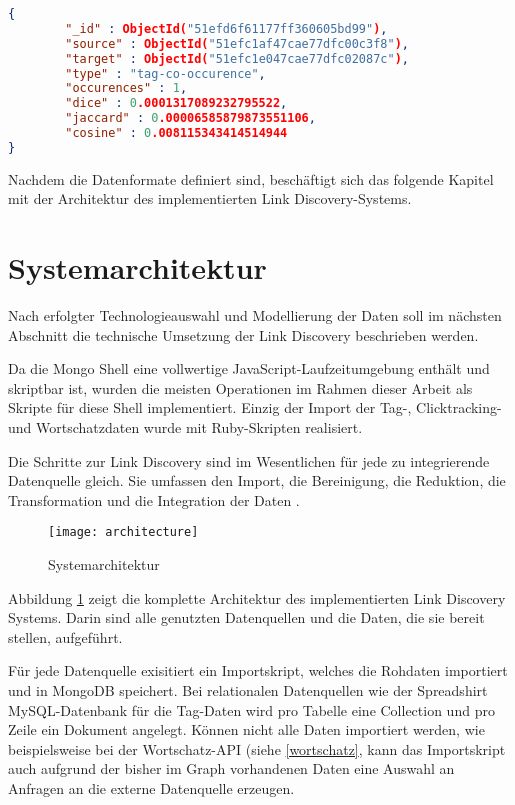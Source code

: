 \begin{lstlisting}[language=json, label={lst:edge_json}, caption={Kantendokument in JSON}]
{
        "_id" : ObjectId("51efd6f61177ff360605bd99"),
        "source" : ObjectId("51efc1af47cae77dfc00c3f8"),
        "target" : ObjectId("51efc1e047cae77dfc02087c"),
        "type" : "tag-co-occurence",
        "occurences" : 1,
        "dice" : 0.0001317089232795522,
        "jaccard" : 0.00006585879873551106,
        "cosine" : 0.008115343414514944
}
\end{lstlisting}

Nachdem die Datenformate definiert sind, beschäftigt sich das folgende Kapitel mit der Architektur des implementierten Link Discovery-Systems.

\section{Systemarchitektur}

Nach erfolgter Technologieauswahl und Modellierung der Daten soll im nächsten Abschnitt die technische Umsetzung der Link Discovery beschrieben werden.

Da die Mongo Shell eine vollwertige JavaScript-Laufzeitumgebung enthält und skriptbar ist, wurden die meisten Operationen im Rahmen dieser Arbeit als Skripte für diese Shell implementiert. Einzig der Import der Tag-, Clicktracking- und Wortschatzdaten wurde mit Ruby-Skripten realisiert.

Die Schritte zur Link Discovery sind im Wesentlichen für jede zu integrierende Datenquelle gleich. Sie umfassen den Import, die Bereinigung, die Reduktion, die Transformation und die Integration der Daten \cite{hkp2012}.

\begin{figure}
\centering
\texttt{[image: architecture]}
\caption{Systemarchitektur}
\label{fig:architecture}
\end{figure}

Abbildung \ref{fig:architecture} zeigt die komplette Architektur des implementierten Link Discovery Systems. Darin sind alle genutzten Datenquellen und die Daten, die sie bereit stellen, aufgeführt.

Für jede Datenquelle exisitiert ein Importskript, welches die Rohdaten importiert und in MongoDB speichert. Bei relationalen Datenquellen wie der Spreadshirt MySQL-Datenbank für die Tag-Daten wird pro Tabelle eine Collection und pro Zeile ein Dokument angelegt. Können nicht alle Daten importiert werden, wie beispielsweise bei der Wortschatz-API (siehe \ref{wortschatz}, kann das Importskript auch aufgrund der bisher im Graph vorhandenen Daten eine Auswahl an Anfragen an die externe Datenquelle erzeugen.

